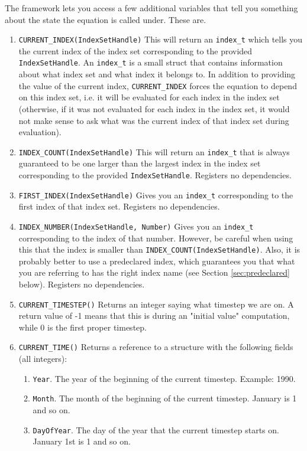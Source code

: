 \documentclass[11pt]{article}
\theoremstyle{definition}
\begin{document}
The framework lets you access a few additional variables that tell you something about the state the equation is called under. These are.
\begin{enumerate}[i]
\item {\tt CURRENT\_INDEX(IndexSetHandle)} This will return an {\tt index\_t} which tells you the current index of the index set corresponding to the provided {\tt IndexSetHandle}. An {\tt index\_t} is a small struct that contains information about what index set and what index it belongs to. In addition to providing the value of the current index, {\tt CURRENT\_INDEX} forces the equation to depend on this index set, i.e. it will be evaluated for each index in the index set (otherwise, if it was not evaluated for each index in the index set, it would not make sense to ask what was the current index of that index set during evaluation).
\item {\tt INDEX\_COUNT(IndexSetHandle)} This will return an {\tt index\_t} that is always guaranteed to be one larger than the largest index in the index set corresponding to the provided {\tt IndexSetHandle}. Registers no dependencies.
\item {\tt FIRST\_INDEX(IndexSetHandle)} Gives you an {\tt index\_t} corresponding to the first index of that index set. Registers no dependencies.
\item {\tt INDEX\_NUMBER(IndexSetHandle, Number)} Gives you an {\tt index\_t} corresponding to the index of that number. However, be careful when using this that the index is smaller than {\tt INDEX\_COUNT(IndexSetHandle)}. Also, it is probably better to use a predeclared index, which guarantees you that what you are referring to has the right index name  (see Section \ref{sec:predeclared} below). Registers no dependencies.
\item {\tt CURRENT\_TIMESTEP()} Returns an integer saying what timestep we are on. A return value of -1 means that this is during an "initial value" computation, while 0 is the first proper timestep.
\item {\tt CURRENT\_TIME()} Returns a reference to a structure with the following fields (all integers):
	\begin{enumerate}[1]
	\item {\tt Year}. The year of the beginning of the current timestep. Example: 1990.
	\item {\tt Month}. The month of the beginning of the current timestep. January is 1 and so on.
	\item {\tt DayOfYear}. The day of the year that the current timestep starts on. January 1st is 1 and so on.

\end{enumerate}
\end{enumerate}
\end{document}
